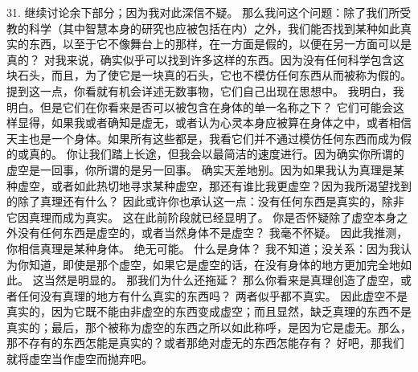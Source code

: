 31.  继续讨论余下部分；因为我对此深信不疑。 那么我问这个问题：除了我们所受教的科学（其中智慧本身的研究也应被包括在内）之外，我们能否找到某种如此真实的东西，以至于它不像舞台上的那样，在一方面是假的，以便在另一方面可以是真的？ 对我来说，确实似乎可以找到许多这样的东西。因为没有任何科学包含这块石头，而且，为了使它是一块真的石头，它也不模仿任何东西从而被称为假的。提到这一点，你看就有机会详述无数事物，它们自己出现在思想中。 我明白，我明白。但是它们在你看来是否可以被包含在身体的单一名称之下？ 它们可能会这样显得，如果我或者确知是虚无，或者认为心灵本身应被算在身体之中，或者相信天主也是一个身体。如果所有这些都是，我看它们并不通过模仿任何东西而成为假的或真的。 你让我们踏上长途，但我会以最简洁的速度进行。因为确实你所谓的虚空是一回事，你所谓的是另一回事。 确实天差地别。因为如果我认为真理是某种虚空，或者如此热切地寻求某种虚空，那还有谁比我更虚空？因为我所渴望找到的除了真理还有什么？ 因此或许你也承认这一点：没有任何东西是真实的，除非它因真理而成为真实。 这在此前阶段就已经显明了。 你是否怀疑除了虚空本身之外没有任何东西是虚空的，或者当然身体不是虚空？ 我毫不怀疑。 因此我推测，你相信真理是某种身体。 绝无可能。 什么是身体？ 我不知道；没关系：因为我认为你知道，即使是那个虚空，如果它是虚空的话，在没有身体的地方更加完全地如此。 这当然是明显的。 那我们为什么还拖延？ 那么你看来是真理创造了虚空，或者任何没有真理的地方有什么真实的东西吗？ 两者似乎都不真实。 因此虚空不是真实的，因为它既不能由非虚空的东西变成虚空；而且显然，缺乏真理的东西不是真实的；最后，那个被称为虚空的东西之所以如此称呼，是因为它是虚无。那么，那不存有的东西怎能是真实的？或者那绝对虚无的东西怎能存有？ 好吧，那我们就将虚空当作虚空而抛弃吧。\par

